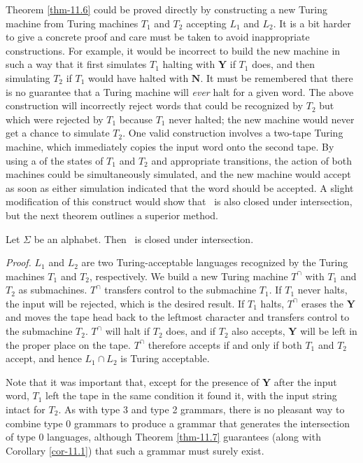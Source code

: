 Theorem \ref{thm-11.6} could be proved directly by constructing a new Turing machine
from Turing machines $T_1$ and $T_2$ accepting $L_1$ and $L_2$. It is a bit
harder to give a concrete proof and care must be taken to avoid inappropriate
constructions. For example, it would be incorrect to build the new machine in
such a way that it first simulates $T_1$ halting with $\pmb{Y}$ if $T_1$ does,
and then simulating $T_2$ if $T_1$ would have halted with $\pmb{N}$. It must be
remembered that there is no guarantee that a Turing machine will \emph{ever}
halt for a given word. The above construction will incorrectly reject words that
could be recognized by $T_2$ but which were rejected by $T_1$ because $T_1$
never halted; the new machine would never get a chance to simulate $T_2$. One
valid construction involves a two-tape Turing machine, which immediately copies
the input word onto the second tape. By using a  of the states of
$T_1$ and $T_2$ and appropriate transitions, the action of both machines
could be simultaneously simulated, and the new machine would accept as soon as
either simulation indicated that the word should be accepted. A slight
modification of this construct would show that \TSIG\ is also closed under
intersection, but the next theorem outlines a superior method.

\begin{thm}\label{thm-11.7}
Let $\Sigma$ be an alphabet. Then \TSIG\ is closed under intersection.

\emph{Proof.} $L_1$ and $L_2$ are two Turing-acceptable languages recognized by
the Turing machines $T_1$ and $T_2$, respectively. We build a new Turing machine
$T^{\cap}$ with $T_1$ and $T_2$ as submachines. $T^{\cap}$ transfers control to
the submachine $T_1$. If $T_1$ never halts, the input will be rejected, which is
the desired result. If $T_1$ halts, $T^{\cap}$ erases the $\pmb{Y}$ and moves
the tape head back to the leftmost character and transfers control to the
submachine $T_2$. $T^{\cap}$ will halt if $T_2$ does, and if $T_2$ also accepts,
$\pmb{Y}$ will be left in the proper place on the tape. $T^{\cap}$ therefore
accepts if and only if both $T_1$ and $T_2$ accept, and hence $L_1\cap L_2$ is
Turing acceptable.
\end{thm}

Note that it was important that, except for the presence of $\pmb{Y}$ after the
input word, $T_1$ left the tape in the same condition it found it, with the
input string intact for $T_2$. As with type 3 and type 2 grammars, there is no
pleasant way to combine type 0 grammars to produce a grammar that generates the
intersection of type 0 languages, although Theorem \ref{thm-11.7} guarantees (along with Corollary \ref{cor-11.1}) that such a
grammar must surely exist.

